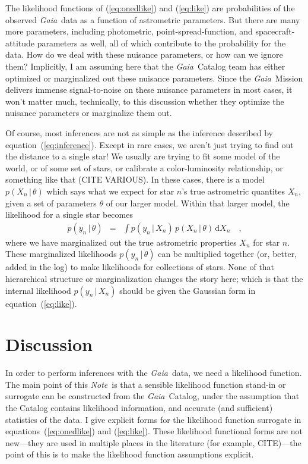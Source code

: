 \documentclass[12pt, modern]{aastex62}
\newcommand{\Gaia}{\textsl{Gaia}}
\newcommand{\documentname}{\textsl{Note}}
\newcommand{\equationname}{equation}
\newcommand{\dd}{\mathrm{d}}
\newcommand{\given}{\,|\,}
\begin{document}
The likelihood functions of (\ref{eq:onedlike}) and (\ref{eq:like}) are
probabilities of the observed \Gaia\ data as a
function of astrometric parameters.
But there are many more parameters, including photometric, point-spread-function,
and spacecraft-attitude parameters as well, all of which contribute to the probability
for the data.
How do we deal with these nuisance parameters, or how can we ignore them?
Implicitly, I am assuming here that the \Gaia\ Catalog team has either optimized
or marginalized out these nuisance parameters.
Since the \Gaia\ Mission delivers immense signal-to-noise on these nuisance
parameters in most cases, it won't matter much, technically, to this
discussion whether they optimize
the nuisance parameters or marginalize them out.

Of course, most inferences are not as simple as the inference described by
\equationname~(\ref{eq:inference}).
Except in rare cases, we aren't just trying to find out the distance to a single
star!
We usually are trying to fit some model of the world, or of some set of stars,
or calibrate a color-luminosity relationship, or something like that (CITE VARIOUS).
In these cases, there is a model $p(X_n\given\theta)$ which says what we expect
for star $n$'s true astrometric quantites $X_n$, given a set of parameters $\theta$
of our larger model.
Within that larger model, the likelihood for a single star becomes
\begin{eqnarray}
p(y_n\given\theta) &=& \int p(y_n\given X_n)\,p(X_n\given\theta)\,\dd X_n
\quad ,
\end{eqnarray}
where we have marginalized out the true astrometric properties $X_n$ for star $n$.
These marginalized likelihoods $p(y_n\given\theta)$
can be multiplied together (or, better, added in the log)
to make likelihoods for collections of stars.
None of that hierarchical structure or marginalization changes the story here;
which is that the internal likelihood $p(y_n\given X_n)$ should be given the
Gaussian form in \equationname~(\ref{eq:like}).

\section{Discussion}
In order to perform inferences
with the \Gaia\ data, we need a likelihood function.
The main point of this \documentname\ is that a sensible likelihood function
stand-in or surrogate can be constructed from the \Gaia\ Catalog, under the assumption
that the Catalog contains likelihood information, and accurate (and sufficient)
statistics of the data.
I give explicit forms for the likelihood function surrogate in
\equationname s~(\ref{eq:onedlike}) and (\ref{eq:like}).
These likelihood functional forms are not new---they are used in multiple places
in the literature (for example, CITE)---the point of this is to make the
likelihood function assumptions explicit.
\end{document}
